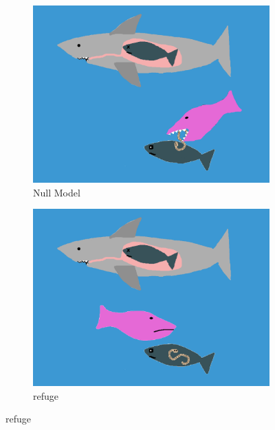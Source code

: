 \documentclass[11pt]{amsart}
\begin{document}
\begin{figure}
\begin{subfigure}{.45\textwidth}
\caption{Null Model\label{subfig:modelsA}}
\includegraphics[width=\textwidth]{../figures/Null.png}
\end{subfigure}
\begin{subfigure}{.45\textwidth}
\caption{refuge\label{subfig:modelsb}}
\includegraphics[width=\textwidth]{../figures/Null+Ref.png}
\end{subfigure}


\end{figure}
\end{document}
